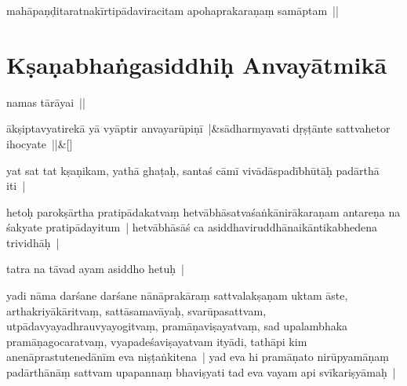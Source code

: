 \documentclass[article,12pt,a4paper]{memoir}%
\newcounter{parCount}
\begin{document}
	  \pstart \leavevmode%
	mahāpaṇḍitaratnakīrtipādaviracitam apohaprakaraṇaṃ samāptam || 
	{}
	\pend%
      
	    
	    \endnumbering%
	    \endgroup
	    
	  
	  
	
	    
	    \begingroup
	    \beginnumbering%
	    
	  
\chapter*[{Kṣaṇabhaṅgasiddhiḥ Anvayātmikā}]{Kṣaṇabhaṅgasiddhiḥ  Anvayātmikā}\label{Kṣaṇabhaṅgasiddhiḥ_Anvayātmikā}

	  \pstart \leavevmode%
	\label{thakur75-67.3}namas tārāyai ||
	{}
	\pend%
      
	    
	    \stanza[\smallbreak]
	  \label{ratnakīrtinibandhāvali__36r1OI6NR531EDRWPU9XOG3N62S}ākṣiptavyatirekā yā vyāptir anvayarūpiṇī |&sādharmyavati dṛṣṭānte sattvahetor ihocyate ||\&[\smallbreak]
	  
	  
	  

	  \pstart \leavevmode%
	\label{thakur75-67.6}yat sat tat kṣaṇikam, yathā ghaṭaḥ, santaś cāmī vivādāspadībhūtāḥ padārthā iti |
	{}
	\pend%
      

	  \pstart \leavevmode%
	\label{thakur75-67.8}hetoḥ parokṣārtha pratipādakatvaṃ hetvābhāsatvaśaṅkānirākaraṇam antareṇa na śakyate pratipādayitum | hetvābhāsāś ca asiddhaviruddhānaikāntikabhedena trividhāḥ |
	{}
	\pend%
      

	  \pstart \leavevmode%
	\label{thakur75-67.11}tatra na tāvad ayam asiddho hetuḥ |
	{}
	\pend%
      

	  \pstart \leavevmode%
	\label{thakur75-67.12}yadi nāma darśane darśane nānāprakāraṃ sattvalakṣaṇam uktam āste, arthakriyākāritvaṃ, sattāsamavāyaḥ, svarūpasattvam, utpādavyayadhrauvyayogitvaṃ, pramāṇaviṣayatvaṃ, sad upalambhaka pramāṇagocaratvaṃ, vyapadeśaviṣayatvam ityādi, tathāpi kim anenāprastutenedānīm eva niṣṭaṅkitena | yad eva hi pramāṇato nirūpyamāṇaṃ padārthānāṃ sattvam upapannaṃ bhaviṣyati tad eva vayam api svīkariṣyāmaḥ | 
	{}
	\pend%
      
\end{document}
